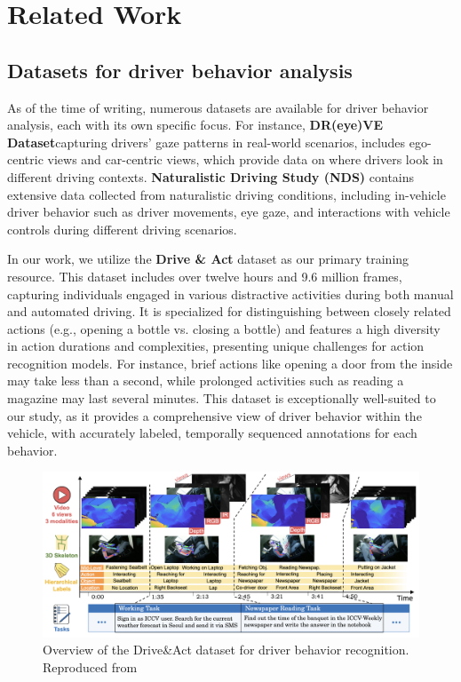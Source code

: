 \chapter{Related Work}\label{chapter:relatedwork}

\section{Datasets for driver behavior analysis}

As of the time of writing, numerous datasets are available for driver behavior analysis, each with its own specific focus. For instance, \textbf{DR(eye)VE Dataset}\cite{palazzi2018predicting}capturing drivers' gaze patterns in real-world scenarios, includes ego-centric views and car-centric views, which provide data on where drivers look in different driving contexts. \textbf{Naturalistic Driving Study (NDS)}\cite{regan2012naturalistic} contains extensive data collected from naturalistic driving conditions, including in-vehicle driver behavior such as driver movements, eye gaze, and interactions with vehicle controls during different driving scenarios.


In our work, we utilize the \textbf{Drive \& Act} dataset\cite{9009583} as our primary training resource. This dataset includes over twelve hours and 9.6 million frames, capturing individuals engaged in various distractive activities during both manual and automated driving. It is specialized for distinguishing between closely related actions (e.g., opening a bottle vs. closing a bottle) and features a high diversity in action durations and complexities, presenting unique challenges for action recognition models. For instance, brief actions like opening a door from the inside may take less than a second, while prolonged activities such as reading a magazine may last several minutes. This dataset is exceptionally well-suited to our study, as it provides a comprehensive view of driver behavior within the vehicle, with accurately labeled, temporally sequenced annotations for each behavior.


\begin{figure}
    \centering
    \includegraphics[width=\linewidth]{figures/03_DriveAct.png}
    \caption{Overview of the Drive\&Act dataset for driver behavior recognition. Reproduced from\cite{9009583}}
    \label{fig:DriveAct}
\end{figure}

